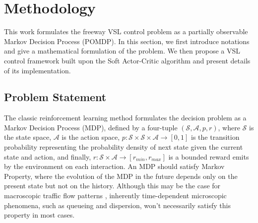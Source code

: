 \documentclass[11pt, letterpaper]{article}
\begin{document}

\section{Methodology}

This work formulates the freeway VSL control problem as a partially observable Markov Decision Process (POMDP). In this section, we first introduce notations and give a mathematical formulation of the problem. We then propose a VSL control framework built upon the Soft Actor-Critic algorithm and present details of its implementation.

\subsection{Problem Statement}

The classic reinforcement learning method formulates the decision problem as a Markov Decision Process (MDP), defined by a four-tuple $\left(\mathcal{S}, \mathcal{A}, p, r\right)$, where $\mathcal{S}$ is the state space, $\mathcal{A}$ is the action space, $p:\mathcal{S}\times\mathcal{S}\times\mathcal{A}\rightarrow\left[0, 1\right]$ is the transition probability representing the probability density of next state given the current state and action, and finally, $r:\mathcal{S}\times\mathcal{A}\rightarrow\left[r_{min},r_{max}\right]$ is a bounded reward emits by the environment on each interaction. An MDP should satisfy Markov Property, where the evolution of the MDP in the future depends only on the present state but not on the history. Although this may be the case for macroscopic traffic flow patterns \citep{shi_research_2016}, inherently time-dependent microscopic phenomena, such as queueing and dispersion, won't necessarily satisfy this property in most cases.
\end{document}
